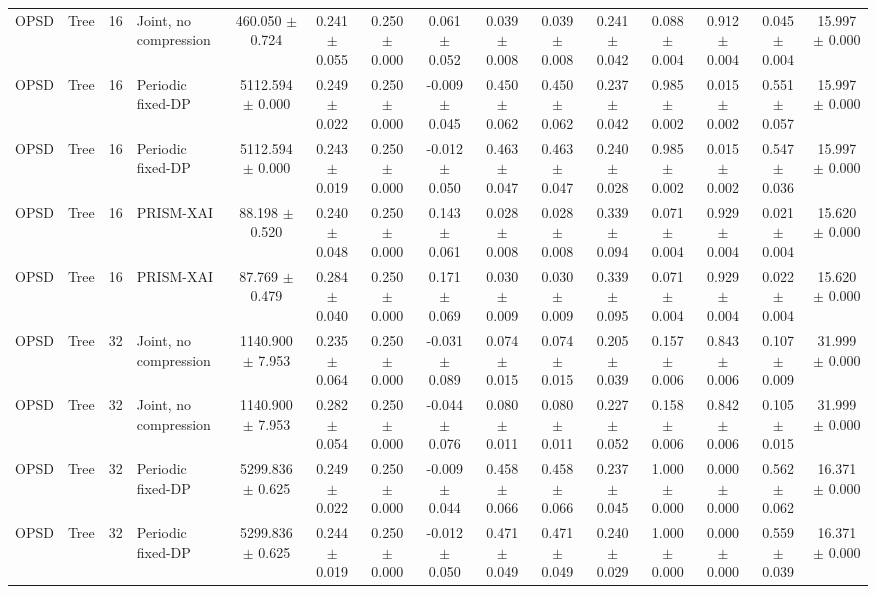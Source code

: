 \begin{table}[t]
\begin{tabular}{llllccccccccccc}
OPSD & Tree & 16 & Joint, no compression & 460.050 $\pm$ 0.724 & 0.241 $\pm$ 0.055 & 0.250 $\pm$ 0.000 & 0.061 $\pm$ 0.052 & 0.039 $\pm$ 0.008 & 0.039 $\pm$ 0.008 & 0.241 $\pm$ 0.042 & 0.088 $\pm$ 0.004 & 0.912 $\pm$ 0.004 & 0.045 $\pm$ 0.004 & 15.997 $\pm$ 0.000 \\
OPSD & Tree & 16 & Periodic fixed-DP & 5112.594 $\pm$ 0.000 & 0.249 $\pm$ 0.022 & 0.250 $\pm$ 0.000 & -0.009 $\pm$ 0.045 & 0.450 $\pm$ 0.062 & 0.450 $\pm$ 0.062 & 0.237 $\pm$ 0.042 & 0.985 $\pm$ 0.002 & 0.015 $\pm$ 0.002 & 0.551 $\pm$ 0.057 & 15.997 $\pm$ 0.000 \\
OPSD & Tree & 16 & Periodic fixed-DP & 5112.594 $\pm$ 0.000 & 0.243 $\pm$ 0.019 & 0.250 $\pm$ 0.000 & -0.012 $\pm$ 0.050 & 0.463 $\pm$ 0.047 & 0.463 $\pm$ 0.047 & 0.240 $\pm$ 0.028 & 0.985 $\pm$ 0.002 & 0.015 $\pm$ 0.002 & 0.547 $\pm$ 0.036 & 15.997 $\pm$ 0.000 \\
OPSD & Tree & 16 & PRISM-XAI & 88.198 $\pm$ 0.520 & 0.240 $\pm$ 0.048 & 0.250 $\pm$ 0.000 & 0.143 $\pm$ 0.061 & 0.028 $\pm$ 0.008 & 0.028 $\pm$ 0.008 & 0.339 $\pm$ 0.094 & 0.071 $\pm$ 0.004 & 0.929 $\pm$ 0.004 & 0.021 $\pm$ 0.004 & 15.620 $\pm$ 0.000 \\
OPSD & Tree & 16 & PRISM-XAI & 87.769 $\pm$ 0.479 & 0.284 $\pm$ 0.040 & 0.250 $\pm$ 0.000 & 0.171 $\pm$ 0.069 & 0.030 $\pm$ 0.009 & 0.030 $\pm$ 0.009 & 0.339 $\pm$ 0.095 & 0.071 $\pm$ 0.004 & 0.929 $\pm$ 0.004 & 0.022 $\pm$ 0.004 & 15.620 $\pm$ 0.000 \\
OPSD & Tree & 32 & Joint, no compression & 1140.900 $\pm$ 7.953 & 0.235 $\pm$ 0.064 & 0.250 $\pm$ 0.000 & -0.031 $\pm$ 0.089 & 0.074 $\pm$ 0.015 & 0.074 $\pm$ 0.015 & 0.205 $\pm$ 0.039 & 0.157 $\pm$ 0.006 & 0.843 $\pm$ 0.006 & 0.107 $\pm$ 0.009 & 31.999 $\pm$ 0.000 \\
OPSD & Tree & 32 & Joint, no compression & 1140.900 $\pm$ 7.953 & 0.282 $\pm$ 0.054 & 0.250 $\pm$ 0.000 & -0.044 $\pm$ 0.076 & 0.080 $\pm$ 0.011 & 0.080 $\pm$ 0.011 & 0.227 $\pm$ 0.052 & 0.158 $\pm$ 0.006 & 0.842 $\pm$ 0.006 & 0.105 $\pm$ 0.015 & 31.999 $\pm$ 0.000 \\
OPSD & Tree & 32 & Periodic fixed-DP & 5299.836 $\pm$ 0.625 & 0.249 $\pm$ 0.022 & 0.250 $\pm$ 0.000 & -0.009 $\pm$ 0.044 & 0.458 $\pm$ 0.066 & 0.458 $\pm$ 0.066 & 0.237 $\pm$ 0.045 & 1.000 $\pm$ 0.000 & 0.000 $\pm$ 0.000 & 0.562 $\pm$ 0.062 & 16.371 $\pm$ 0.000 \\
OPSD & Tree & 32 & Periodic fixed-DP & 5299.836 $\pm$ 0.625 & 0.244 $\pm$ 0.019 & 0.250 $\pm$ 0.000 & -0.012 $\pm$ 0.050 & 0.471 $\pm$ 0.049 & 0.471 $\pm$ 0.049 & 0.240 $\pm$ 0.029 & 1.000 $\pm$ 0.000 & 0.000 $\pm$ 0.000 & 0.559 $\pm$ 0.039 & 16.371 $\pm$ 0.000 \\

\end{tabular}
\end{table}
